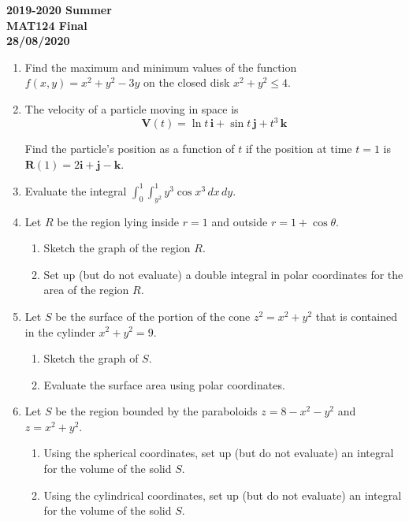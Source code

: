 \documentclass[a4paper, 12pt]{article}
\begin{document}
\pagestyle{empty}

\begin{center}
\textbf{2019-2020 Summer\\MAT124 Final\\28/08/2020}
\end{center}

\begin{enumerate}[leftmargin=*,label=\textbf{\arabic*.}]
\item Find the maximum and minimum values of the function $f(x,y)=x^2+y^2-3y$ on the closed disk $x^2+y^2\leq4$.

\item The velocity of a particle moving in space is
\[\mathbf{V}(t)=\ln t\,\mathbf{i} +\sin t\,\mathbf{j}+ t^3\,\mathbf{k}\]

Find the particle's position as a function of $t$ if the position at time $t=1$ is \linebreak $\mathbf{R}(1)=2\mathbf{i}+\mathbf{j}-\mathbf{k}$.
\item Evaluate the integral $\displaystyle \int_0^1\int_{y^2}^1 y^3\cos x^3\,dx\,dy$.

\item Let $R$ be the region lying inside $r=1$ and outside $r=1+\cos\theta$.

\begin{enumerate}[leftmargin=*,label=\textbf{\alph*.}]
\item Sketch the graph of the region $R$.
\item Set up (but do not evaluate) a double integral in polar coordinates for the area of the region $R$.
\end{enumerate}

\item Let $S$ be the surface of the portion of the cone $z^2=x^2+y^2$ that is contained in the cylinder $x^2+y^2=9$.

\begin{enumerate}[leftmargin=*,label=\textbf{\alph*.}]
\item Sketch the graph of $S$.
\item Evaluate the surface area using polar coordinates.
\end{enumerate}

\item Let $S$ be the region bounded by the paraboloids $z=8-x^2-y^2$ and $z=x^2+y^2$.

\begin{enumerate}[leftmargin=*,label=\textbf{\alph*.}]
\item Using the spherical coordinates, set up (but do not evaluate) an integral for the volume of the solid $S$.
\item Using the cylindrical coordinates, set up (but do not evaluate) an integral for the volume of the solid $S$.
\end{enumerate}
\end{enumerate}
\end{document}

